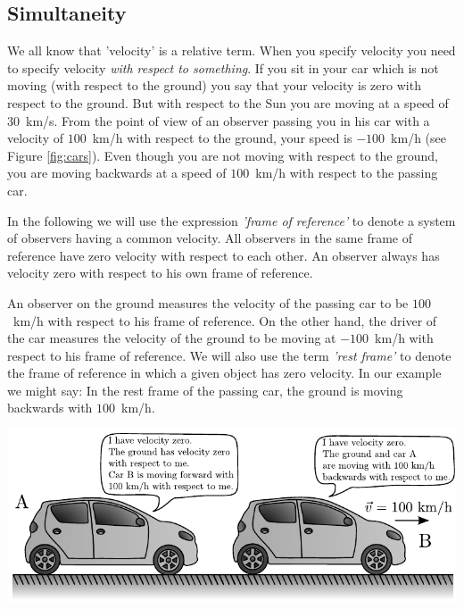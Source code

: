 {\begin{multicols}{2}

\section{Simultaneity}
\label{sect:simul}

We all know that 'velocity' is a relative term. When you specify velocity you need to specify velocity \emph{with respect to something}. If you sit in your car which is not moving (with respect to the ground) you say that your velocity is zero with respect to the ground. But with respect to the Sun you are moving at a speed of $30$~km/s. From the point of view of an observer passing you in his car with a velocity of $100$~km/h with respect to the ground, your speed is $-100$~km/h (see Figure \ref{fig:cars}). Even though you are not moving with respect to the ground, you are moving backwards at a speed of $100$~km/h with respect to the passing car. 

In the following we will use the expression \emph{'frame of reference'} to denote a system of observers having a common velocity. All observers in the same frame of reference have zero velocity with respect to each other. An observer always has velocity zero with respect to his own frame of reference. 

An observer on the ground measures the velocity of the passing car to be $100$~km/h with respect to his frame of reference. On the other hand, the driver of the car measures the velocity of the ground to be moving at $-100$~km/h with respect to his frame of reference. 
We will also use the term \emph{'rest frame'} to denote the frame of reference in which a given object has zero velocity. In our example we might say: In the rest frame of the passing car, the ground is moving backwards with $100$~km/h.

\begin{Figure}%
\centering
\includegraphics[width=\textwidth]{fig_7-1.pdf}
\end{Figure}


\end{multicols}}
